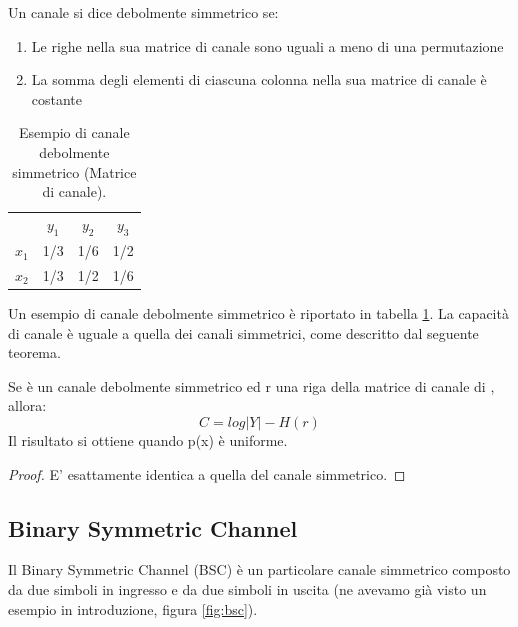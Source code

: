 \medskip

\begin{definizione}
 Un canale si dice debolmente simmetrico se:
 \begin{enumerate}
  \item Le righe nella sua matrice di canale sono uguali a meno di una permutazione
  \item La somma degli elementi di ciascuna colonna nella sua matrice di canale è costante
 \end{enumerate}
\end{definizione}

\begin{table}[htbp]
  \begin{center}
   \begin{tabular}{c c c c}
	  & $y_1$ & $y_2$ & $y_3$ \\
	$x_1$ & 1/3 & 1/6 & 1/2 \\ 
	$x_2$ & 1/3 & 1/2 & 1/6  \\ 
    \end{tabular}
  \end{center}
  \label{tdsim}
  \caption{Esempio di canale debolmente simmetrico (Matrice di canale).}
\end{table}

\noindent
Un esempio di canale debolmente simmetrico è riportato in tabella \ref{tdsim}.
La capacità di canale è uguale a quella dei canali simmetrici, come descritto dal seguente teorema.

\begin{teorema}
 Se  è un canale debolmente simmetrico ed r una riga della matrice di canale di , allora:
 \[
  C=log|Y| - H(r)
 \]
 Il risultato si ottiene quando p(x) è uniforme.
\begin{proof}
 E' esattamente identica a quella del canale simmetrico.
\end{proof}

\end{teorema}

\subsection{Binary Symmetric Channel}

Il Binary Symmetric Channel (BSC) è un particolare canale simmetrico composto da due simboli in ingresso e da due simboli in uscita (ne avevamo già visto un esempio in introduzione, figura \ref{fig:bsc}).

